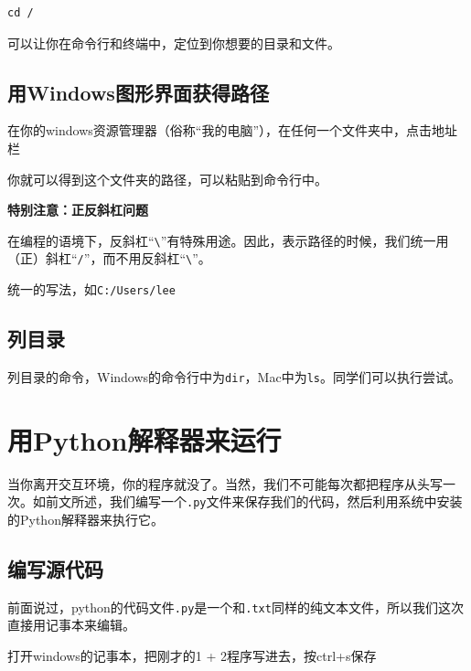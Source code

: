 \documentclass[
]{book}
\begin{document}
\begin{verbatim}
cd /
\end{verbatim}

可以让你在命令行和终端中，定位到你想要的目录和文件。

\hypertarget{use_win}{%
\subsection{用Windows图形界面获得路径}\label{use_win}}

在你的windows资源管理器（俗称``我的电脑''），在任何一个文件夹中，点击地址栏

你就可以得到这个文件夹的路径，可以粘贴到命令行中。

{\textbf{特别注意：正反斜杠问题}}

在编程的语境下，反斜杠``\texttt{\textbackslash{}}''有特殊用途。因此，表示路径的时候，我们统一用（正）斜杠``\texttt{/}''，而不用反斜杠``\texttt{\textbackslash{}}''。

统一的写法，如\texttt{C:/Users/lee}

\hypertarget{ux5217ux76eeux5f55}{%
\subsection{列目录}\label{ux5217ux76eeux5f55}}

列目录的命令，Windows的命令行中为\texttt{dir}，Mac中为\texttt{ls}。同学们可以执行尝试。

\hypertarget{ux7528pythonux89e3ux91caux5668ux6765ux8fd0ux884c}{%
\section{用Python解释器来运行}\label{ux7528pythonux89e3ux91caux5668ux6765ux8fd0ux884c}}

当你离开交互环境，你的程序就没了。当然，我们不可能每次都把程序从头写一次。如前文所述，我们编写一个\texttt{.py}文件来保存我们的代码，然后利用系统中安装的Python解释器来执行它。

\hypertarget{ux7f16ux5199ux6e90ux4ee3ux7801}{%
\subsection{编写源代码}\label{ux7f16ux5199ux6e90ux4ee3ux7801}}

前面说过，python的代码文件\texttt{.py}是一个和\texttt{.txt}同样的纯文本文件，所以我们这次直接用记事本来编辑。

打开windows的记事本，把刚才的1 + 2程序写进去，按ctrl+s保存
\end{document}
